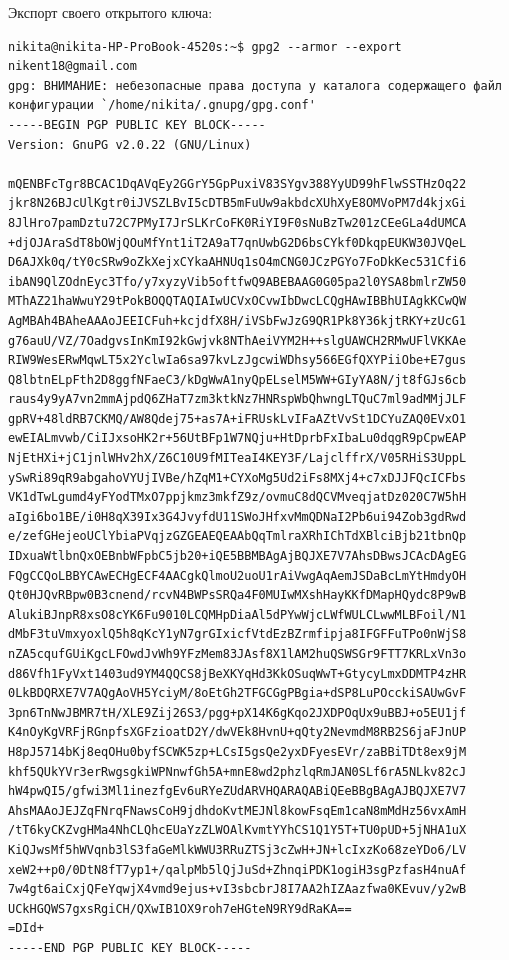 \documentclass[10pt,a4paper]{report}
\begin{document}
Экспорт своего открытого ключа:
\begin{verbatim}
nikita@nikita-HP-ProBook-4520s:~$ gpg2 --armor --export nikent18@gmail.com
gpg: ВНИМАНИЕ: небезопасные права доступа у каталога содержащего файл конфигурации `/home/nikita/.gnupg/gpg.conf'
-----BEGIN PGP PUBLIC KEY BLOCK-----
Version: GnuPG v2.0.22 (GNU/Linux)

mQENBFcTgr8BCAC1DqAVqEy2GGrY5GpPuxiV83SYgv388YyUD99hFlwSSTHzOq22
jkr8N26BJcUlKgtr0iJVSZLBvI5cDTB5mFuUw9akbdcXUhXyE8OMVoPM7d4kjxGi
8JlHro7pamDztu72C7PMyI7JrSLKrCoFK0RiYI9F0sNuBzTw201zCEeGLa4dUMCA
+djOJAraSdT8bOWjQOuMfYnt1iT2A9aT7qnUwbG2D6bsCYkf0DkqpEUKW30JVQeL
D6AJXk0q/tY0cSRw9oZkXejxCYkaAHNUq1sO4mCNG0JCzPGYo7FoDkKec531Cfi6
ibAN9QlZOdnEyc3Tfo/y7xyzyVib5oftfwQ9ABEBAAG0G05pa2l0YSA8bmlrZW50
MThAZ21haWwuY29tPokBOQQTAQIAIwUCVxOCvwIbDwcLCQgHAwIBBhUIAgkKCwQW
AgMBAh4BAheAAAoJEEICFuh+kcjdfX8H/iVSbFwJzG9QR1Pk8Y36kjtRKY+zUcG1
g76auU/VZ/7OadgvsInKmI92kGwjvk8NThAeiVYM2H++slgUAWCH2RMwUFlVKKAe
RIW9WesERwMqwLT5x2YclwIa6sa97kvLzJgcwiWDhsy566EGfQXYPiiObe+E7gus
Q8lbtnELpFth2D8ggfNFaeC3/kDgWwA1nyQpELselM5WW+GIyYA8N/jt8fGJs6cb
raus4y9yA7vn2mmAjpdQ6ZHaT7zm3ktkNz7HNRspWbQhwngLTQuC7ml9adMMjJLF
gpRV+48ldRB7CKMQ/AW8Qdej75+as7A+iFRUskLvIFaAZtVvSt1DCYuZAQ0EVxO1
ewEIALmvwb/CiIJxsoHK2r+56UtBFp1W7NQju+HtDprbFxIbaLu0dqgR9pCpwEAP
NjEtHXi+jC1jnlWHv2hX/Z6C10U9fMITeaI4KEY3F/LajclffrX/V05RHiS3UppL
ySwRi89qR9abgahoVYUjIVBe/hZqM1+CYXoMg5Ud2iFs8MXj4+c7xDJJFQcICFbs
VK1dTwLgumd4yFYodTMxO7ppjkmz3mkfZ9z/ovmuC8dQCVMveqjatDz020C7W5hH
aIgi6bo1BE/i0H8qX39Ix3G4JvyfdU11SWoJHfxvMmQDNaI2Pb6ui94Zob3gdRwd
e/zefGHejeoUClYbiaPVqjzGZGEAEQEAAbQqTmlraXRhIChTdXBlciBjb21tbnQp
IDxuaWtlbnQxOEBnbWFpbC5jb20+iQE5BBMBAgAjBQJXE7V7AhsDBwsJCAcDAgEG
FQgCCQoLBBYCAwECHgECF4AACgkQlmoU2uoU1rAiVwgAqAemJSDaBcLmYtHmdyOH
Qt0HJQvRBpw0B3cnend/rcvN4BWPsSRQa4F0MUIwMXshHayKKfDMapHQydc8P9wB
AlukiBJnpR8xsO8cYK6Fu9010LCQMHpDiaAl5dPYwWjcLWfWULCLwwMLBFoil/N1
dMbF3tuVmxyoxlQ5h8qKcY1yN7grGIxicfVtdEzBZrmfipja8IFGFFuTPo0nWjS8
nZA5cqufGUiKgcLFOwdJvWh9YFzMem83JAsf8X1lAM2huQSWSGr9FTT7KRLxVn3o
d86Vfh1FyVxt1403ud9YM4QQCS8jBeXKYqHd3KkOSuqWwT+GtycyLmxDDMTP4zHR
0LkBDQRXE7V7AQgAoVH5YciyM/8oEtGh2TFGCGgPBgia+dSP8LuPOcckiSAUwGvF
3pn6TnNwJBMR7tH/XLE9Zij26S3/pgg+pX14K6gKqo2JXDPOqUx9uBBJ+o5EU1jf
K4nOyKgVRFjRGnpfsXGFzioatD2Y/dwVEk8HvnU+qQty2NevmdM8RB2S6jaFJnUP
H8pJ5714bKj8eqOHu0byfSCWK5zp+LCsI5gsQe2yxDFyesEVr/zaBBiTDt8ex9jM
khf5QUkYVr3erRwgsgkiWPNnwfGh5A+mnE8wd2phzlqRmJAN0SLf6rA5NLkv82cJ
hW4pwQI5/gfwi3Ml1inezfgEv6uRYeZUdARVHQARAQABiQEeBBgBAgAJBQJXE7V7
AhsMAAoJEJZqFNrqFNawsCoH9jdhdoKvtMEJNl8kowFsqEm1caN8mMdHz56vxAmH
/tT6kyCKZvgHMa4NhCLQhcEUaYzZLWOAlKvmtYYhCS1Q1Y5T+TU0pUD+5jNHA1uX
KiQJwsMf5hWVqnb3lS3faGeMlkWWU3RRuZTSj3cZwH+JN+lcIxzKo68zeYDo6/LV
xeW2++p0/0DtN8fT7yp1+/qalpMb5lQjJuSd+ZhnqiPDK1ogiH3sgPzfasH4nuAf
7w4gt6aiCxjQFeYqwjX4vmd9ejus+vI3sbcbrJ8I7AA2hIZAazfwa0KEvuv/y2wB
UCkHGQWS7gxsRgiCH/QXwIB1OX9roh7eHGteN9RY9dRaKA==
=DId+
-----END PGP PUBLIC KEY BLOCK-----
\end{verbatim}
\end{document}
